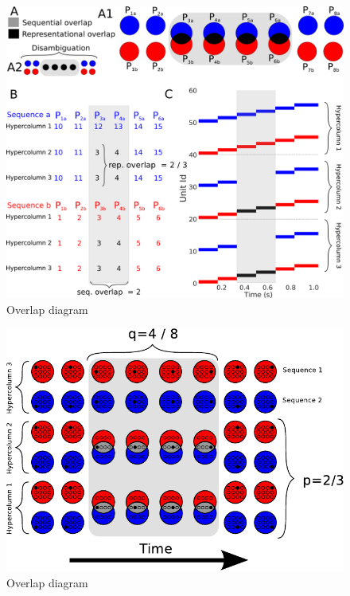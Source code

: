 \documentclass[10pt,a4paper]{article}
\begin{document}
\begin{figure}[H]
\centering
\includegraphics[scale=0.20]{rep_diagram.pdf}
\caption{Overlap diagram}
\label{fig:rep_diagram}
\end{figure}

\begin{figure}[H]
\centering
\includegraphics[scale=0.90]{overlap_diagram.pdf}
\caption{Overlap diagram}
\label{fig:representation_scheme}
\end{figure}
\end{document}
